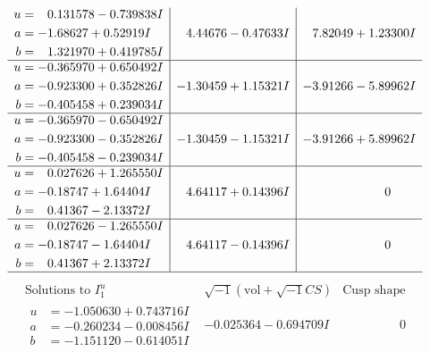 \documentclass[1p]{elsarticle_modified}
\theoremstyle{definition}
\newcommand{\I}{\sqrt{-1}}
\begin{document}
$$\begin{array}{c|c|c}
\begin{aligned}
u &= \phantom{-}0.131578 - 0.739838 I \\
a &= -1.68627 + 0.52919 I \\
b &= \phantom{-}1.321970 + 0.419785 I\end{aligned}
 & \phantom{-}4.44676 - 0.47633 I & \phantom{-}7.82049 + 1.23300 I \\ \hline\begin{aligned}
u &= -0.365970 + 0.650492 I \\
a &= -0.923300 + 0.352826 I \\
b &= -0.405458 + 0.239034 I\end{aligned}
 & -1.30459 + 1.15321 I & -3.91266 - 5.89962 I \\ \hline\begin{aligned}
u &= -0.365970 - 0.650492 I \\
a &= -0.923300 - 0.352826 I \\
b &= -0.405458 - 0.239034 I\end{aligned}
 & -1.30459 - 1.15321 I & -3.91266 + 5.89962 I \\ \hline\begin{aligned}
u &= \phantom{-}0.027626 + 1.265550 I \\
a &= -0.18747 + 1.64404 I \\
b &= \phantom{-}0.41367 - 2.13372 I\end{aligned}
 & \phantom{-}4.64117 + 0.14396 I & \phantom{-0.000000 } 0 \\ \hline\begin{aligned}
u &= \phantom{-}0.027626 - 1.265550 I \\
a &= -0.18747 - 1.64404 I \\
b &= \phantom{-}0.41367 + 2.13372 I\end{aligned}
 & \phantom{-}4.64117 - 0.14396 I & \phantom{-0.000000 } 0\\
 \hline 
 \end{array}$$\newpage$$\begin{array}{c|c|c}  
\text{Solutions to }I^u_{1}& \I (\text{vol} + \sqrt{-1}CS) & \text{Cusp shape}\\
 \hline 
\begin{aligned}
u &= -1.050630 + 0.743716 I \\
a &= -0.260234 - 0.008456 I \\
b &= -1.151120 - 0.614051 I\end{aligned}
 & -0.025364 - 0.694709 I & \phantom{-0.000000 } 0 \\ \hline\begin{aligned}

\end{aligned}
\end{array}$$
\end{document}
